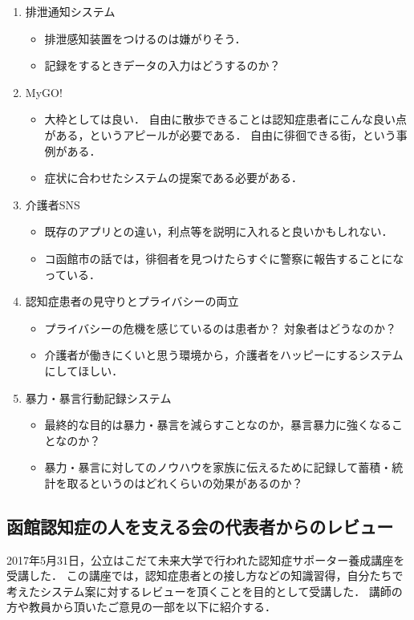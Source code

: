 \documentclass[../report]{subfiles}
\begin{document}
\begin{enumerate}
    \item[] 排泄通知システム
\begin{itemize}
    \item 排泄感知装置をつけるのは嫌がりそう．
    \item 記録をするときデータの入力はどうするのか？
\end{itemize}

    \item[] MyGO!
\begin{itemize}
    \item 大枠としては良い．
自由に散歩できることは認知症患者にこんな良い点がある，というアピールが必要である．
自由に徘徊できる街，という事例がある\cite{haikai}．
    \item 症状に合わせたシステムの提案である必要がある．
\end{itemize}

    \item[] 介護者SNS
\begin{itemize}
    \item 既存のアプリとの違い，利点等を説明に入れると良いかもしれない．
    \item コ函館市の話では，徘徊者を見つけたらすぐに警察に報告することになっている．
\end{itemize}

    \item[] 認知症患者の見守りとプライバシーの両立
\begin{itemize}
    \item プライバシーの危機を感じているのは患者か？
対象者はどうなのか？
    \item 介護者が働きにくいと思う環境から，介護者をハッピーにするシステムにしてほしい．
\end{itemize}

    \item[] 暴力・暴言行動記録システム
\begin{itemize}
    \item 最終的な目的は暴力・暴言を減らすことなのか，暴言暴力に強くなることなのか？
    \item 暴力・暴言に対してのノウハウを家族に伝えるために記録して蓄積・統計を取るというのはどれくらいの効果があるのか？
\end{itemize}
\end{enumerate}


\subsection{函館認知症の人を支える会の代表者からのレビュー} \label{sec:4_hyouka_before2}
2017年5月31日，公立はこだて未来大学で行われた認知症サポーター養成講座を受講した．
この講座では，認知症患者との接し方などの知識習得，自分たちで考えたシステム案に対するレビューを頂くことを目的として受講した．
講師の方や教員から頂いたご意見の一部を以下に紹介する．
\end{document}
